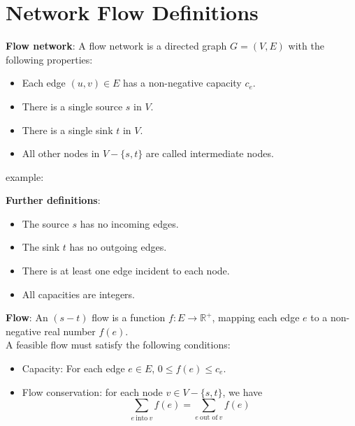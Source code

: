 \documentclass[onecolumn]{report}
\begin{document}
\section{Network Flow Definitions}
\textbf{Flow network}:
A flow network is a directed graph $G=(V,E)$ with the following properties:
\begin{itemize}
    \item Each edge $(u,v)\in E$ has a non-negative capacity $c_e$.
    \item There is a single source $s$ in $V$.
    \item There is a single sink $t$ in $V$.
    \item All other nodes in $V-\{s,t\}$ are called intermediate nodes.
\end{itemize}
example:
\begin{center}
\end{center}
\noindent
\textbf{Further definitions}:
\begin{itemize}
    \item The source $s$ has no incoming edges.
    \item The sink $t$ has no outgoing edges.
    \item There is at least one edge incident to each node.
    \item All capacities are integers.
\end{itemize}
\noindent
\textbf{Flow}:
An $(s-t)$ flow is a function $f:E \rightarrow \mathbb{R^+}$, mapping each edge $e$ to a non-negative real number $f(e)$.\\
A feasible flow must satisfy the following conditions:
\begin{itemize}
    \item Capacity: For each edge $e\in E$, $0 \leq f(e) \leq c_e$.
    \item Flow conservation: for each node $v\in V-\{s,t\}$, we have
    \begin{equation*}
        \sum_{e \:\text{into} \: v}f(e)=\sum_{e \: \text{out of}\: v}f(e)
    \end{equation*}
\end{itemize}
\end{document}
